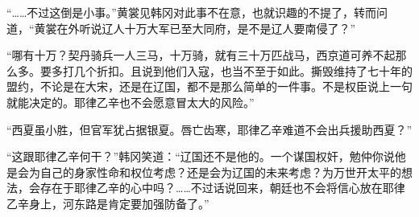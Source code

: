 “……不过这倒是小事。”黄裳见韩冈对此事不在意，也就识趣的不提了，转而问道，“黄裳在外听说辽人十万大军已至大同府，是不是辽人要南侵了？”

“哪有十万？契丹骑兵一人三马，十万骑，就有三十万匹战马，西京道可养不起那么多。要多打几个折扣。且说到他们入寇，也当不至于如此。撕毁维持了七十年的盟约，不论是在大宋，还是在辽国，都不是那么简单的一件事。不是权臣说上一句就能决定的。耶律乙辛也不会愿意冒太大的风险。”

“西夏虽小胜，但官军犹占据银夏。唇亡齿寒，耶律乙辛难道不会出兵援助西夏？”

“这跟耶律乙辛何干？”韩冈笑道：“辽国还不是他的。一个谋国权奸，勉仲你说他是会为自己的身家性命和权位考虑？还是会为辽国的未来考虑？为万世开太平的想法，会存在于耶律乙辛的心中吗？……不过话说回来，朝廷也不会将信心放在耶律乙辛身上，河东路是肯定要加强防备了。”

